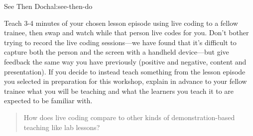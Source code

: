 \begin{challenge}{See Then Do}{chal:see-then-do}

Teach 3-4 minutes of your chosen lesson episode using live coding to a
fellow trainee, then swap and watch while that person live codes for
you. Don't bother trying to record the live coding sessions---we have
found that it's difficult to capture both the person and the screen with
a handheld device---but give feedback the same way you have previously
(positive and negative, content and presentation). If you decide to
instead teach something from the lesson episode you selected in
preparation for this workshop, explain in advance to your fellow trainee
what you will be teaching and what the learners you teach it to are
expected to be familiar with.
\end{challenge}

\begin{quote}
How does live coding compare to other kinds of demonstration-based
teaching like lab lessons?
\end{quote}
